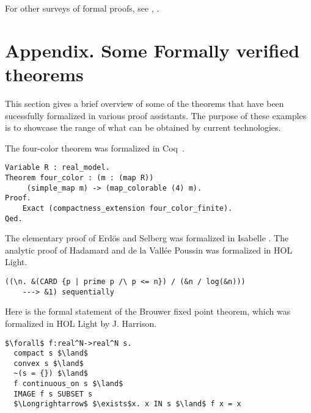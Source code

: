 \documentclass[brochure,english,12pt]{bourbaki}
\theoremstyle{plain}
\begin{document}
For other  surveys of formal proofs, see  \cite{avigad2014formally}, \cite{Hales:2008:formal}.

\section{Appendix. Some Formally verified theorems}


This section gives a brief overview of some of the theorems that have been sucessfully formalized
in various proof assistants.  The purpose of these examples is to showcase the range
of what can be obtained by current technologies.


The four-color theorem was formalized in Coq~\cite{gonthier2008formal}.



\begin{lstlisting}[keepspaces=true,stringstyle=\tt,basicstyle=\small,frame=single,framesep=8pt,morekeywords={Variable,Theorem,Proof,Qed},columns=flexible]
Variable R : real_model. 
Theorem four_color : (m : (map R))
     (simple_map m) -> (map_colorable (4) m). 
Proof.
    Exact (compactness_extension four_color_finite). 
Qed.
\end{lstlisting}


The elementary proof of Erd\"os and Selberg was formalized in Isabelle \cite{avigad2007formally}.  
The analytic proof of Hadamard and de la Vall\'ee Poussin
was formalized in HOL Light\cite{harrison2009formalizing}.  

\begin{lstlisting}[keepspaces=true,stringstyle=\tt,basicstyle=\small,frame=single,framesep=8pt,mathescape,morekeywords={theorem,fixes,assumes,defines,shows,Variable,Theorem,Proof,Qed},columns=flexible]
  ((\n. &(CARD {p | prime p /\ p <= n}) / (&n / log(&n)))
    ---> &1) sequentially
\end{lstlisting}

Here is the formal statement of the Brouwer fixed point theorem, which was formalized in HOL Light by J. Harrison.

\begin{lstlisting}[keepspaces=true,stringstyle=\tt,basicstyle=\small,frame=single,framesep=8pt,mathescape,morekeywords={theorem,fixes,assumes,defines,shows,Variable,Theorem,Proof,Qed},columns=flexible]
  $\forall$ f:real^N->real^N s. 
  compact s $\land$ 
  convex s $\land$
  ~(s = {}) $\land$
  f continuous_on s $\land$
  IMAGE f s SUBSET s
  $\Longrightarrow$ $\exists$x. x IN s $\land$ f x = x
\end{lstlisting}
\end{document}
